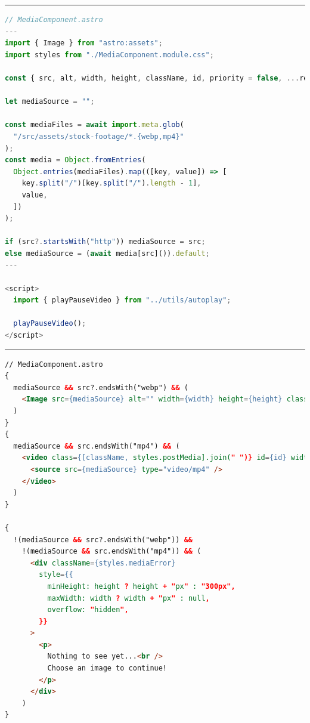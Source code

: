 \documentclass[a4paper, 12pt]{article}
\begin{document}
\vspace{0.5cm} \hrule \vspace{0.5cm}

\begin{lstlisting}[caption=MediaComponent in pure Astro (Frontmatter \& Script), label={lst:Astro:MediaComponent:Script}, language=JavaScript]
// MediaComponent.astro
---
import { Image } from "astro:assets";
import styles from "./MediaComponent.module.css";

const { src, alt, width, height, className, id, priority = false, ...rest } = Astro.props;

let mediaSource = "";

const mediaFiles = await import.meta.glob(
  "/src/assets/stock-footage/*.{webp,mp4}"
);
const media = Object.fromEntries(
  Object.entries(mediaFiles).map(([key, value]) => [
    key.split("/")[key.split("/").length - 1],
    value,
  ])
);

if (src?.startsWith("http")) mediaSource = src;
else mediaSource = (await media[src]()).default;
---

<script>
  import { playPauseVideo } from "../utils/autoplay";

  playPauseVideo();
</script>
\end{lstlisting}

\vspace{0.5cm} \hrule \vspace{0.5cm}

\begin{lstlisting}[caption=MediaComponent in pure Astro (Template), label={lst:Astro:MediaComponent:Template}, language=HTML, firstnumber=29]
// MediaComponent.astro
{
  mediaSource && src?.endsWith("webp") && (
    <Image src={mediaSource} alt="" width={width} height={height} class={[className, styles.postMedia].join(" ")} id={id} loading={priority ? "eager" : "lazy"} {...rest} />
  )
}
{
  mediaSource && src.endsWith("mp4") && (
    <video class={[className, styles.postMedia].join(" ")} id={id} width={width} preload="metadata" controls controlslist="nodownload,nofullscreen,noremoteplayback" disable-picture-in-picture loop muted >
      <source src={mediaSource} type="video/mp4" />
    </video>
  )
}

{
  !(mediaSource && src?.endsWith("webp")) &&
    !(mediaSource && src.endsWith("mp4")) && (
      <div className={styles.mediaError}
        style={{
          minHeight: height ? height + "px" : "300px",
          maxWidth: width ? width + "px" : null,
          overflow: "hidden",
        }}
      >
        <p>
          Nothing to see yet...<br />
          Choose an image to continue!
        </p>
      </div>
    )
}
\end{lstlisting}
\end{document}
